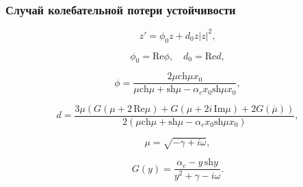 \documentclass[fullscreen=true, unicode, bookmarks=false]{beamer}
\begin{document}
\begin{frame}
\frametitle{ Случай колебательной потери устойчивости }

\begin{equation}
	z' = \phi_0 z + d_0 z |z|^2,
\end{equation}

$$ \phi_0 = \mbox{Re} \phi, \quad d_0 = \mbox{Re} d, $$

\bigskip
\pause

$$ \phi = \frac{ 2 \mu \mbox{ch} \mu x_0 }{ \mu \mbox{ch} \mu +\mbox{sh} \mu - \alpha_c x_0 \mbox{sh} \mu x_0 }, $$

$$ d = \frac{ 3 \mu ( G(\mu + 2\,\mbox{Re}\mu) + G(\mu + 2i\,\mbox{Im}\mu) + 2G(\overline{\mu}) ) }{ 2 ( \mu \mbox{ch} \mu +\mbox{sh} \mu - \alpha_c x_0 \mbox{sh} \mu x_0 ) }, $$

$$ \mu = \sqrt{-\gamma + i \omega}, $$

$$ G(y) = \frac{ \alpha_c - y\,\mbox{sh} y }{ y^2 + \gamma - i\omega }. $$

\end{frame}
\end{document}

